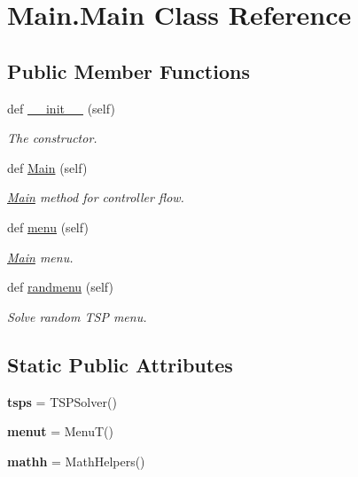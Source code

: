 \hypertarget{classMain_1_1Main}{}\section{Main.\+Main Class Reference}
\label{classMain_1_1Main}
\subsection*{Public Member Functions}
\begin{DoxyCompactItemize}
\item 
def \hyperlink{classMain_1_1Main_a25ab3329d16c1a94a9c9f8a2f5de404a}{\+\_\+\+\_\+init\+\_\+\+\_\+} (self)
\begin{DoxyCompactList}\small\item\em The constructor. \end{DoxyCompactList}\item 
def \hyperlink{classMain_1_1Main_acb8d882aae5f473b8883a278e1f6ca77}{Main} (self)
\begin{DoxyCompactList}\small\item\em \hyperlink{classMain_1_1Main}{Main} method for controller flow. \end{DoxyCompactList}\item 
\mbox{\label{classMain_1_1Main_a9e396757c1fc55f3b7a3d2396f2341b3}} 
def \hyperlink{classMain_1_1Main_a9e396757c1fc55f3b7a3d2396f2341b3}{menu} (self)
\begin{DoxyCompactList}\small\item\em \hyperlink{classMain_1_1Main}{Main} menu. \end{DoxyCompactList}\item 
\mbox{\label{classMain_1_1Main_a7ac6b85722e97bda62289755d8979ea1}} 
def \hyperlink{classMain_1_1Main_a7ac6b85722e97bda62289755d8979ea1}{randmenu} (self)
\begin{DoxyCompactList}\small\item\em Solve random T\+SP menu. \end{DoxyCompactList}\end{DoxyCompactItemize}
\subsection*{Static Public Attributes}
\begin{DoxyCompactItemize}
\item 
\mbox{\label{classMain_1_1Main_abff3a397b2a15828e03e1ddacb7092a9}} 
{\bfseries tsps} = T\+S\+P\+Solver()
\item 
\mbox{\label{classMain_1_1Main_a9715bdc7563c60b3136fbdb8a5bfaabe}} 
{\bfseries menut} = MenuT()
\item 
\mbox{\label{classMain_1_1Main_aacdf2c78720d6a9c24de58dfb8e40109}} 
{\bfseries mathh} = Math\+Helpers()
\end{DoxyCompactItemize}


